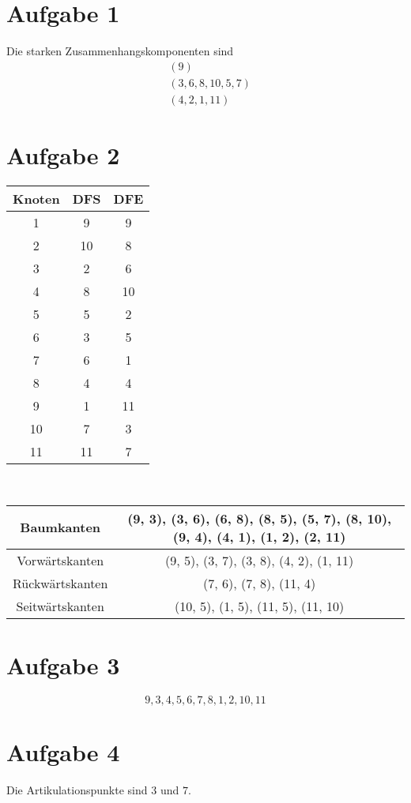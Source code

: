 \documentclass[10pt,a4paper]{article}
\begin{document}
\section{Aufgabe 1}
Die starken Zusammenhangskomponenten sind
\begin{align*}
  & (9)\\
  & (3, 6, 8, 10, 5, 7)\\
  & (4, 2, 1, 11)
\end{align*}

\section{Aufgabe 2}
\begin{tabular}{c|c|c}
Knoten & DFS & DFE\\
\hline
1 & 9 & 9\\
2 & 10 & 8\\
3 & 2 & 6\\
4 & 8 & 10\\
5 & 5 & 2\\
6 & 3 & 5\\
7 & 6 & 1\\
8 & 4 & 4\\
9 & 1 & 11\\
10 & 7 & 3\\
11 & 11 & 7
\end{tabular}
\\
\begin{tabular}{c|c}
  Baumkanten & (9, 3), (3, 6), (6, 8), (8, 5), (5, 7), (8, 10), (9, 4), (4, 1), (1, 2), (2, 11)\\\hline
  Vorwärtskanten & (9, 5), (3, 7), (3, 8), (4, 2), (1, 11)\\\hline
  Rückwärtskanten & (7, 6), (7, 8), (11, 4)\\\hline
  Seitwärtskanten & (10, 5), (1, 5), (11, 5), (11, 10)
\end{tabular}

\section{Aufgabe 3}
\begin{equation}
  9, 3, 4, 5, 6, 7, 8, 1, 2, 10, 11
\end{equation}

\section{Aufgabe 4}
Die Artikulationspunkte sind $3$ und $7$.
\end{document}
